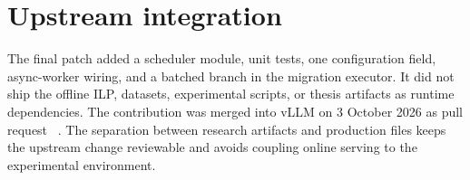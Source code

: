 \section{Upstream integration}

The final patch added a scheduler module, unit tests, one configuration field,
async-worker wiring, and a batched branch in the migration executor. It did not
ship the offline ILP, datasets, experimental scripts, or thesis artifacts as
runtime dependencies. The contribution was merged into vLLM on 3 October 2026
as pull request \prnumber\ \cite{vllmpr52641}. The separation between research
artifacts and production files keeps the upstream change reviewable and avoids
coupling online serving to the experimental environment.
